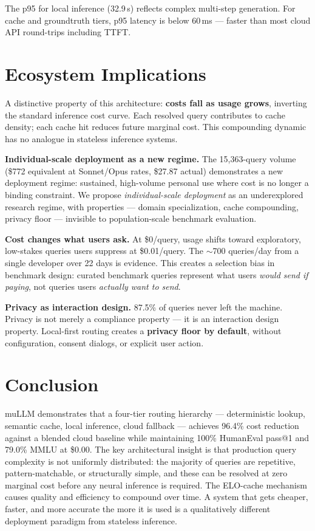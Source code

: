 \documentclass[11pt]{article}
\begin{document}
The p95 for local inference (32.9\,s) reflects complex multi-step
generation. For cache and groundtruth tiers, p95 latency is below
60\,ms --- faster than most cloud API round-trips including TTFT.

\section{Ecosystem Implications}

A distinctive property of this architecture: \textbf{costs fall as
usage grows}, inverting the standard inference cost curve. Each
resolved query contributes to cache density; each cache hit reduces
future marginal cost. This compounding dynamic has no analogue in
stateless inference systems.

\textbf{Individual-scale deployment as a new regime.} The 15,363-query
volume (\$772 equivalent at Sonnet/Opus rates, \$27.87 actual)
demonstrates a new deployment regime: sustained, high-volume personal
use where cost is no longer a binding constraint. We propose
\textit{individual-scale deployment} as an underexplored research
regime, with properties --- domain specialization, cache compounding,
privacy floor --- invisible to population-scale benchmark evaluation.

\textbf{Cost changes what users ask.} At \$0/query, usage shifts toward
exploratory, low-stakes queries users suppress at \$0.01/query. The
$\sim$700 queries/day from a single developer over 22 days is evidence.
This creates a selection bias in benchmark design: curated benchmark
queries represent what users \textit{would send if paying}, not queries
users \textit{actually want to send}.

\textbf{Privacy as interaction design.} 87.5\% of queries never left
the machine. Privacy is not merely a compliance property --- it is an
interaction design property. Local-first routing creates a \textbf{privacy
floor by default}, without configuration, consent dialogs, or explicit
user action.

\section{Conclusion}

muLLM demonstrates that a four-tier routing hierarchy --- deterministic
lookup, semantic cache, local inference, cloud fallback --- achieves
96.4\% cost reduction against a blended cloud baseline while maintaining
100\% HumanEval pass@1 and 79.0\% MMLU at \$0.00. The key architectural
insight is that production query complexity is not uniformly distributed:
the majority of queries are repetitive, pattern-matchable, or
structurally simple, and these can be resolved at zero marginal cost
before any neural inference is required. The ELO-cache mechanism causes
quality and efficiency to compound over time. A system that gets
cheaper, faster, and more accurate the more it is used is a
qualitatively different deployment paradigm from stateless inference.
\end{document}
